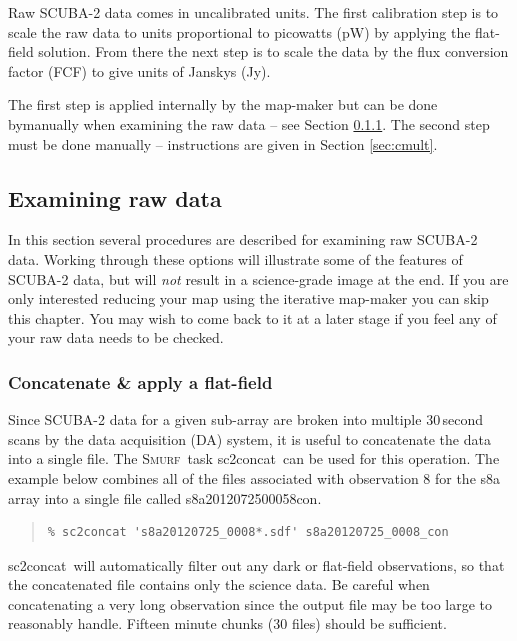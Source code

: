 \documentclass[twoside,11pt]{article}
\newcommand{\xref}[3]{#1}
\newcommand{\xlabel}[1]{}
\renewcommand{\_}{\texttt{\symbol{95}}}
\newenvironment{myquote}{\begin{quote}\begin{small}}{\end{small}\end{quote}}
\newcommand{\smurf}{\xref{\textsc{Smurf}}{sun258}{}}
\newcommand{\task}[1]{\textsf{#1}}
\newcommand{\concat}{\xref{\task{sc2concat}}{sun258}{SC2CONCAT}}
\begin{document}
Raw SCUBA-2 data comes in uncalibrated units. The first calibration step is to scale the raw data to units proportional to picowatts (pW) by applying the flat-field solution. From there the next step is to scale the data by the flux conversion factor (FCF) to give units of Janskys (Jy). 

The first step is applied internally by the map-maker but can be done bymanually when examining the raw data -- see Section \ref{sec:concat}. The second step must be done manually -- instructions are given in Section \ref{sec:cmult}.


\subsection{\xlabel{examine}Examining raw data}
\label{sec:exam}
In this section several procedures are described for examining raw SCUBA-2 data.  Working through these options will illustrate some of the features of SCUBA-2 data, but will {\em not} result in a science-grade image at the end. If you are only interested reducing your map using the iterative map-maker you can skip this chapter. You may wish to come back to it at a later stage if you feel any of your raw data needs to be checked.

\subsubsection{\xlabel{concat}Concatenate \& apply a flat-field}
\label{sec:concat}

Since SCUBA-2 data for a given sub-array are broken into multiple 30\,second scans by the data acquisition (DA) system, it is useful to concatenate the data into a single file. The \smurf\ task \concat\ can be used for this operation. The example below combines all of the files associated with observation 8 for the s8a array into a single file called s8a20120725\_00058\_con.

\begin{myquote}
\begin{verbatim}
% sc2concat 's8a20120725_0008*.sdf' s8a20120725_0008_con
\end{verbatim}
\end{myquote}
\concat\ will automatically filter out any dark or flat-field  observations, so that the concatenated file contains only the science data. Be careful when concatenating a very long observation since the output file may be too large to reasonably handle. Fifteen minute chunks (30 files) should be sufficient.
\end{document}
